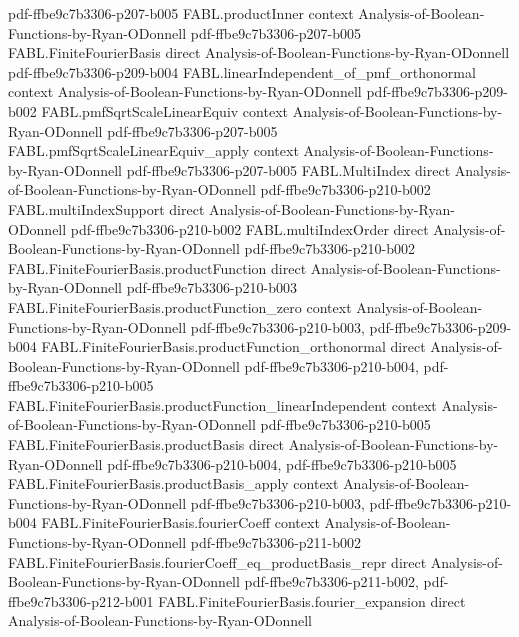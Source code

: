 \begin{theorem}
  {pdf-ffbe9c7b3306-p207-b005}
\proofstep
  {FABL.productInner}
  {context}
  {Analysis-of-Boolean-Functions-by-Ryan-ODonnell}
  {pdf-ffbe9c7b3306-p207-b005}
\proofstep
  {FABL.FiniteFourierBasis}
  {direct}
  {Analysis-of-Boolean-Functions-by-Ryan-ODonnell}
  {pdf-ffbe9c7b3306-p209-b004}
\proofstep
  {FABL.linearIndependent_of_pmf_orthonormal}
  {context}
  {Analysis-of-Boolean-Functions-by-Ryan-ODonnell}
  {pdf-ffbe9c7b3306-p209-b002}
\proofstep
  {FABL.pmfSqrtScaleLinearEquiv}
  {context}
  {Analysis-of-Boolean-Functions-by-Ryan-ODonnell}
  {pdf-ffbe9c7b3306-p207-b005}
\proofstep
  {FABL.pmfSqrtScaleLinearEquiv_apply}
  {context}
  {Analysis-of-Boolean-Functions-by-Ryan-ODonnell}
  {pdf-ffbe9c7b3306-p207-b005}
\proofstep
  {FABL.MultiIndex}
  {direct}
  {Analysis-of-Boolean-Functions-by-Ryan-ODonnell}
  {pdf-ffbe9c7b3306-p210-b002}
\proofstep
  {FABL.multiIndexSupport}
  {direct}
  {Analysis-of-Boolean-Functions-by-Ryan-ODonnell}
  {pdf-ffbe9c7b3306-p210-b002}
\proofstep
  {FABL.multiIndexOrder}
  {direct}
  {Analysis-of-Boolean-Functions-by-Ryan-ODonnell}
  {pdf-ffbe9c7b3306-p210-b002}
\proofstep
  {FABL.FiniteFourierBasis.productFunction}
  {direct}
  {Analysis-of-Boolean-Functions-by-Ryan-ODonnell}
  {pdf-ffbe9c7b3306-p210-b003}
\proofstep
  {FABL.FiniteFourierBasis.productFunction_zero}
  {context}
  {Analysis-of-Boolean-Functions-by-Ryan-ODonnell}
  {pdf-ffbe9c7b3306-p210-b003,
    pdf-ffbe9c7b3306-p209-b004}
\proofstep
  {FABL.FiniteFourierBasis.productFunction_orthonormal}
  {direct}
  {Analysis-of-Boolean-Functions-by-Ryan-ODonnell}
  {pdf-ffbe9c7b3306-p210-b004,
    pdf-ffbe9c7b3306-p210-b005}
\proofstep
  {FABL.FiniteFourierBasis.productFunction_linearIndependent}
  {context}
  {Analysis-of-Boolean-Functions-by-Ryan-ODonnell}
  {pdf-ffbe9c7b3306-p210-b005}
\proofstep
  {FABL.FiniteFourierBasis.productBasis}
  {direct}
  {Analysis-of-Boolean-Functions-by-Ryan-ODonnell}
  {pdf-ffbe9c7b3306-p210-b004,
    pdf-ffbe9c7b3306-p210-b005}
\proofstep
  {FABL.FiniteFourierBasis.productBasis_apply}
  {context}
  {Analysis-of-Boolean-Functions-by-Ryan-ODonnell}
  {pdf-ffbe9c7b3306-p210-b003,
    pdf-ffbe9c7b3306-p210-b004}
\proofstep
  {FABL.FiniteFourierBasis.fourierCoeff}
  {context}
  {Analysis-of-Boolean-Functions-by-Ryan-ODonnell}
  {pdf-ffbe9c7b3306-p211-b002}
\proofstep
  {FABL.FiniteFourierBasis.fourierCoeff_eq_productBasis_repr}
  {direct}
  {Analysis-of-Boolean-Functions-by-Ryan-ODonnell}
  {pdf-ffbe9c7b3306-p211-b002,
    pdf-ffbe9c7b3306-p212-b001}
\proofstep
  {FABL.FiniteFourierBasis.fourier_expansion}
  {direct}
  {Analysis-of-Boolean-Functions-by-Ryan-ODonnell}

\end{theorem}
